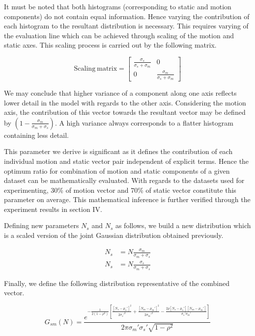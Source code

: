 It must be noted that both histograms (corresponding to static and motion components) do not contain equal information. Hence varying the contribution of each histogram to the resultant distribution is necessary. This requires varying of the evaluation line which can be achieved through scaling of the motion and static axes. This scaling process is carried out by the following matrix.



\[\mathrm{Scaling~matrix} =
\begin{bmatrix}
    \frac {\sigma_s}{\sigma_s + \sigma_m} & 0  \\
    0 & \frac {\sigma_m}{\sigma_s + \sigma_m}
\end{bmatrix}
\]

We may conclude that higher variance of a component along one axis reflects lower detail in the model with regards to the other axis. Considering the motion axis, the contribution of this vector towards the resultant vector may be defined by $(1-\frac{\sigma_m}{\sigma_m+\sigma_s})$. A high variance always corresponds to a flatter histogram containing less detail.

This parameter we derive is significant as it defines the contribution of each individual motion and static vector pair independent of explicit terms. Hence the optimum ratio for combination of motion and static components of a given dataset can be mathematically evaluated. With regards to the datasets used for experimenting, 30\% of motion
vector and 70\% of static vector constitute this parameter on average. This mathematical inference is further verified through the experiment results in section IV.

Defining new parameters $N_s$ and $N_s$ as follows, we build a new distribution which is a scaled version of the joint Gaussian distribution obtained previously.

\begin{align*}
N_s &= N \frac{\sigma_m}{\sigma_m+\sigma_s}  \\
N_s &= N \frac{\sigma_s}{\sigma_m+\sigma_s}
\end{align*}

Finally, we define the following distribution representative of the combined vector.

\begin{equation}
G_{sm}(N)= \frac{e^{-\frac{1}{2(1-\rho^2)}\left[\frac{[N_s-\mu_s']^2}{2\sigma_s'^2} + \frac{[N_m-\mu_m']^2}{2\sigma_m'^2} - \frac{2\rho[N_s-\mu_s'][N_m-\mu_m']}{\sigma_s' \sigma_m'}  \right]}}{2\pi\sigma_m'\sigma_s'\sqrt{1-\rho^2}}
\end{equation}


